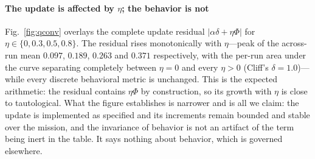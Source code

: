 \paragraph*{The update is affected by $\eta$; the behavior is not}
Fig.~\ref{fig:qconv} overlays the complete update residual
$|\alpha\delta+\eta\Phi|$ for $\eta\in\{0,0.3,0.5,0.8\}$. The residual rises
monotonically with $\eta$---peak of the across-run mean $0.097$, $0.189$, $0.263$ and
$0.371$ respectively, with the per-run area under the curve separating completely
between $\eta=0$ and every $\eta>0$ (Cliff's $\delta=1.0$)---while every discrete
behavioral metric is unchanged. This is the expected arithmetic: the residual
contains $\eta\Phi$ by construction, so its growth with $\eta$ is close to
tautological. What the figure establishes is narrower and is all we claim: the update
is implemented as specified and its increments remain bounded and stable over the
mission, and the invariance of behavior is not an artifact of the term being inert in
the table. It says nothing about behavior, which is governed elsewhere.
